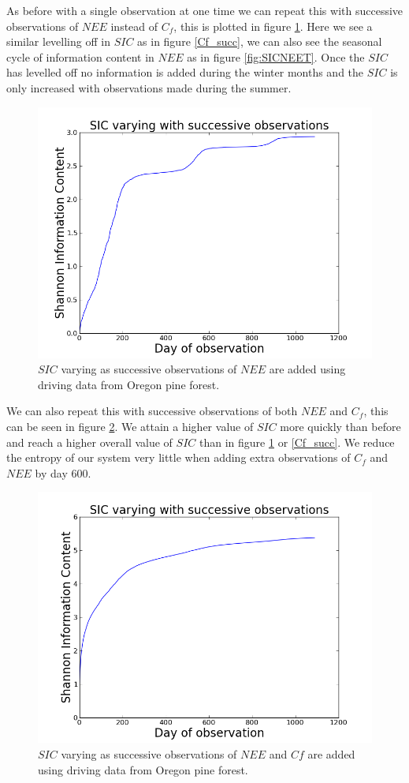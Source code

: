 \documentclass[11pt]{article}
\begin{document}
As before with a single observation at one time we can repeat this with successive observations of $NEE$ instead of $C_f$, this is plotted in figure \ref{SIC_succ}. Here we see a similar levelling off in $SIC$ as in figure \ref{Cf_succ}, we can also see the seasonal cycle of information content in $NEE$ as in figure \ref{fig:SICNEET}. Once the $SIC$ has levelled off no information is added during the winter months and the $SIC$ is only increased with observations made during the summer.

\begin{figure}[h]
\centering
\includegraphics[height=.34\textwidth]{SIC0_1090nee.png}
\caption{$SIC$ varying as successive observations of $NEE$ are added using driving data from Oregon pine forest.}
\label{SIC_succ}
\end{figure} 

We can also repeat this with successive observations of both $NEE$ and $C_f$, this can be seen in figure \ref{fig:SIC_neecfsubplot}. We attain a higher value of $SIC$ more quickly than before and reach a higher overall value of $SIC$ than in figure \ref{SIC_succ} or \ref{Cf_succ}. We reduce the entropy of our system very little when adding extra observations of $C_f$ and $NEE$ by day 600.

\begin{figure}[h]
\centering
\includegraphics[height=.34\textwidth]{SIC0_1090cfnee.png}
\caption{$SIC$ varying as successive observations of $NEE$ and $Cf$ are added using driving data from Oregon pine forest.}
\label{fig:SIC_neecfsubplot}
\end{figure}
\end{document}
